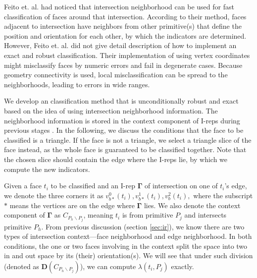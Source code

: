 \documentclass[10pt,journal,compsoc]{IEEEtran}
\begin{document}
\label{sec:individual}

Feito et. al. \cite{feito2013fast} had noticed that intersection neighborhood can be used for fast classification of faces around that intersection. According to their method, faces adjacent to intersection have neighbors from other primitive(s) that define the position and orientation for each other, by which the indicators are determined. However, Feito et. al. did not give detail description of how to implement an exact and robust classification. Their implementation of using vertex coordinates might misclassify faces by numeric errors and fail in degenerate cases. Because geometry connectivity is used, local misclassification can be spread to the neighborhoods, leading to errors in wide ranges.

We develop an classification method that is unconditionally robust and exact based on the idea of using intersection neighborhood information. The neighborhood information is stored in the context component of I-reps during previous stages . In the following, we discuss the conditions that the face to be classified is a triangle. If the face is not a triangle, we select a triangle slice of the face instead, as the whole face is guaranteed to be classified together. Note that the chosen slice should contain the edge where the I-reps lie, by which we compute the new indicators.

Given a face $t_i$ to be classified and an I-rep $\boldsymbol\Gamma$ of intersection on one of $t_i$'s edge, we denote the three corners it as $v_{b*}^{0}(t_i), v_{b*}^{1}(t_i), v_b^2(t_i),$ where the subscript $*$ means the vertices are on the edge where $\boldsymbol\Gamma$ lies. We also denote the context component of $\boldsymbol\Gamma$ as $C_{P_h \backslash P_j}$, meaning $t_i$ is from primitive $P_j$ and intersects primitive $P_h$. From previous discussion (section \ref{sec:ir}){\color{red}{may be more than one}}, we know there are two types of intersection context---face neighborhood and edge neighborhood. In both conditions, the one or two faces involving in the context split the space into two in and out space by its (their) orientation(s). We will see that under such division (denoted as $\boldsymbol{D}(C_{P_h \backslash P_j})$), we can compute $\lambda(t_i, P_j)$ exactly.
\end{document}
